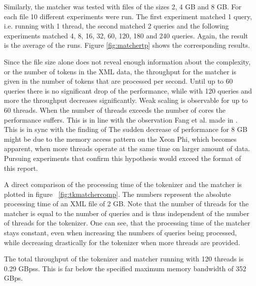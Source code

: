 Similarly, the matcher was tested with files of the sizes 2, 4 GB and 8 GB. For
each file 10 different experiments were run. The first experiment matched 1
query, i.e. running with 1 thread, the second matched 2 queries and the
following experiments matched 4, 8, 16, 32, 60, 120, 180 and 240 queries.
Again, the result is the average of the runs. Figure \ref{fig:matchertp}
shows the corresponding results.

Since the file size alone does not reveal enough information about the
complexity, or the number of tokens in the XML data, the throughput for the
matcher is given in the number of tokens that are processed per second. Until up
to 60 queries there is no significant drop of the performance, while with 120
queries and more the throughput decreases significantly. Weak scaling is
observable for up to 60 threads. When the number of threads exceeds the number
of cores the performance suffers. This is in line with the observation Fang et
al. made in \cite{Fang14}. This is in sync with the finding of  The sudden
decrease of performance for 8 GB might be due to the memory access pattern on
the Xeon Phi, which becomes apparent, when more threads operate at the same time
on larger amount of data.  Pursuing experiments that confirm this hypothesis
would exceed the format of this report. 

A direct comparison of the processing time of the tokenizer and the matcher is
plotted in figure ~\ref{fig:tkmatchercomp}. The numbers represent the absolute
processing time of an XML file of 2 GB. Note that the number of threads for the
matcher is equal to the number of queries and is thus independent of the number
of threads for the tokenizer. One can see, that the processing time of the
matcher stays constant, even when increasing the numbers of queries being
processed, while decreasing drastically for the tokenizer when more threads are
provided.

The total throughput of the tokenizer and matcher running with 120 threads is
0.29 GBpss. This is far below the specified maximum memory bandwidth of 352
GBps. 
